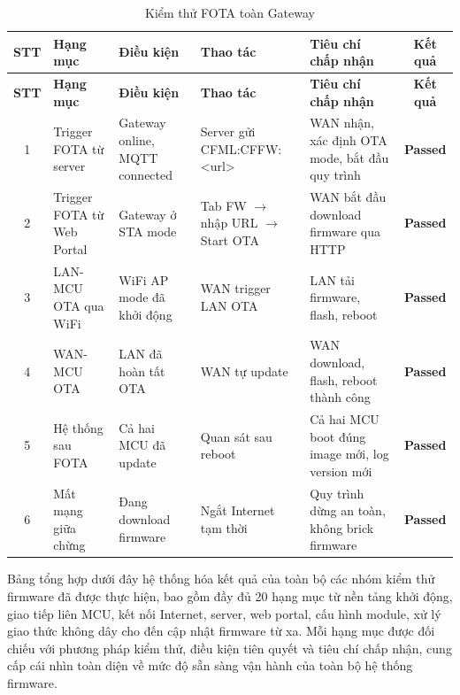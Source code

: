         \begin{longtable}{|c|p{2cm}|p{2.5cm}|p{3.5cm}|p{4cm}|c|}
            \caption{Kiểm thử FOTA toàn Gateway}
            \label{tab:test_fota_gateway} \\
            \hline
            \textbf{STT} & \textbf{Hạng mục} & \textbf{Điều kiện} & \textbf{Thao tác} & \textbf{Tiêu chí chấp nhận} & \textbf{Kết quả} \\ \hline
            \endfirsthead
            \hline
            \textbf{STT} & \textbf{Hạng mục} & \textbf{Điều kiện} & \textbf{Thao tác} & \textbf{Tiêu chí chấp nhận} & \textbf{Kết quả} \\ \hline
            \endhead
            \hline
            \endfoot
            \endlastfoot

            1 & Trigger FOTA từ server & Gateway online, MQTT connected & Server gửi CFML:CFFW:\newline<url> & WAN nhận, xác định OTA mode, bắt đầu quy trình & \textcolor{modern_blue}{\textbf{Passed}} \\ \hline
            2 & Trigger FOTA từ Web Portal & Gateway ở STA mode & Tab FW $\rightarrow$ nhập URL $\rightarrow$ Start OTA & WAN bắt đầu download firmware qua HTTP & \textcolor{modern_blue}{\textbf{Passed}} \\ \hline
            3 & LAN-MCU OTA qua WiFi & WiFi AP mode đã khởi động & WAN trigger LAN OTA & LAN tải firmware, flash, reboot & \textcolor{modern_blue}{\textbf{Passed}} \\ \hline
            4 & WAN-MCU OTA & LAN đã hoàn tất OTA & WAN tự update & WAN download, flash, reboot thành công & \textcolor{modern_blue}{\textbf{Passed}} \\ \hline
            5 & Hệ thống sau FOTA & Cả hai MCU đã update & Quan sát sau reboot & Cả hai MCU boot đúng image mới, log version mới & \textcolor{modern_blue}{\textbf{Passed}} \\ \hline
            6 & Mất mạng giữa chừng & Đang download firmware & Ngắt Internet tạm thời & Quy trình dừng an toàn, không brick firmware & \textcolor{modern_blue}{\textbf{Passed}} \\ \hline
        \end{longtable}

        Bảng tổng hợp dưới đây hệ thống hóa kết quả của toàn bộ các nhóm kiểm thử firmware đã được thực hiện, bao gồm đầy đủ 20 hạng mục từ nền tảng khởi động, giao tiếp liên MCU, kết nối Internet, server, web portal, cấu hình module, xử lý giao thức không dây cho đến cập nhật firmware từ xa. Mỗi hạng mục được đối chiếu với phương pháp kiểm thử, điều kiện tiên quyết và tiêu chí chấp nhận, cung cấp cái nhìn toàn diện về mức độ sẵn sàng vận hành của toàn bộ hệ thống firmware.

